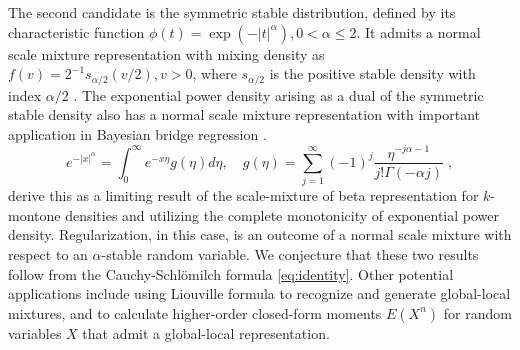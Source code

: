 \documentclass[ECP]{ejpecp} %
\def\CS{Cauchy-Schl\"omilch}
\begin{document}
The second candidate is the symmetric stable distribution, defined by its characteristic function $\phi(t) = \exp( -|t|^{\alpha}), 0 < \alpha \leq 2$. It admits a normal scale mixture representation with mixing density as $f(v) = 2^{-1} s_{\alpha/2}(v/2), v > 0$, where $s_{\alpha/2}$ is the positive stable density with index $\alpha / 2$ \cite{gneiting1997normal}. The exponential power density arising as a dual of the symmetric stable density also has a normal scale mixture representation with important application in
Bayesian bridge regression \cite{polson_bayesian_2014}.
\[
e^{-|x|^\alpha} = \int_0^{\infty} e^{-x\eta} g(\eta) d\eta, \quad g(\eta) = \sum_{j=1}^{\infty} (-1)^j \frac{\eta^{-j \alpha-1}}{j! \Gamma(-\alpha j)}
  \;,
\]
\cite{polson_bayesian_2014} derive this as a limiting result of the scale-mixture of beta representation for $k$-montone densities and utilizing the complete monotonicity of exponential power density. Regularization, in this case, is an outcome of a normal scale mixture with respect to an $\alpha$-stable random variable.  We conjecture that these two results follow from the \CS{} formula \eqref{eq:identity}. Other potential applications include using Liouville formula to recognize and generate global-local mixtures, and to calculate higher-order closed-form moments $E(X^n)$ for random variables $X$ that admit a global-local representation. 




%
%


%
%
%
%
%
%
%
%
\end{document}
